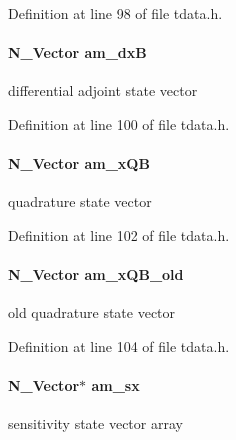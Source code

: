 Definition at line 98 of file tdata.\+h.

\hypertarget{struct_temp_data_a6dc87d123304fe3c6a20899fca777501}{}
\paragraph[{am\+\_\+dx\+B}]{\setlength{\rightskip}{0pt plus 5cm}N\+\_\+\+Vector am\+\_\+dx\+B}\label{struct_temp_data_a6dc87d123304fe3c6a20899fca777501}
differential adjoint state vector 

Definition at line 100 of file tdata.\+h.

\hypertarget{struct_temp_data_ac4099b4f6bf1f15d7d07b88993515da7}{}
\paragraph[{am\+\_\+x\+Q\+B}]{\setlength{\rightskip}{0pt plus 5cm}N\+\_\+\+Vector am\+\_\+x\+Q\+B}\label{struct_temp_data_ac4099b4f6bf1f15d7d07b88993515da7}
quadrature state vector 

Definition at line 102 of file tdata.\+h.

\hypertarget{struct_temp_data_a132a821ce32c806eb4691a94da216e29}{}
\paragraph[{am\+\_\+x\+Q\+B\+\_\+old}]{\setlength{\rightskip}{0pt plus 5cm}N\+\_\+\+Vector am\+\_\+x\+Q\+B\+\_\+old}\label{struct_temp_data_a132a821ce32c806eb4691a94da216e29}
old quadrature state vector 

Definition at line 104 of file tdata.\+h.

\hypertarget{struct_temp_data_a5253085927038bdeb7c327aa14470722}{}
\paragraph[{am\+\_\+sx}]{\setlength{\rightskip}{0pt plus 5cm}N\+\_\+\+Vector$\ast$ am\+\_\+sx}\label{struct_temp_data_a5253085927038bdeb7c327aa14470722}
sensitivity state vector array 

